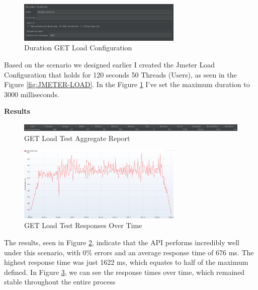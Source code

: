 \documentclass[a4paper,11pt,openright,BCOR=15mm]{scrbook}
\begin{document}
		\begin{figure}[H]
			\centering
			\includegraphics[width=0.7\textwidth]{figs/Performance/Test Configuration/Duration-SOAK-LOAD-JMETER.png}
			\caption{Duration GET Load Configuration}
			\label{fig:DurationGetLoad}
		\end{figure}

		Based on the scenario we designed earlier I created the Jmeter Load Configuration that holds for 120 seconds 50 Threads (Users), as seen in the Figure \ref{fig:JMETER-LOAD}. In the Figure \ref{fig:DurationGetLoad} I've set the maximum duration to 3000 milliseconds.



		\textbf{Results}


		\begin{figure}[H]
			\centering
			\includegraphics[width=\textwidth]{figs/Performance/Results/JMETER GET LOAD AR.png}
			\caption{GET Load Test Aggregate Report}
			\label{fig:GETLoadAggregateReport}
		\end{figure}
		\begin{figure}[H]
			\centering
			\includegraphics[width=0.7\textwidth]{figs/Performance/Results/JMETER GET LOAD ROT.png}
			\caption{GET Load Test Responses Over Time}
			\label{fig:GETLoadResposesOverTime}
		\end{figure}

		The results, seen in Figure \ref{fig:GETLoadAggregateReport}, indicate that the API performs incredibly well under this scenario, with 0\% errors and an average response time of 676 ms. The highest response time was just 1622 ms, which equates to half of the maximum defined.
		In Figure \ref{fig:GETLoadResposesOverTime}, we can see the response times over time, which remained stable throughout the entire process		
\end{document}
